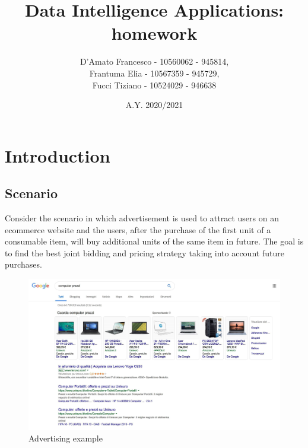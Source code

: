 \documentclass[12pt,a4paper]{report}
\title{Data Intelligence Applications: homework}
\author{D'Amato Francesco - 10560062 - 945814, \\
	Frantuma Elia - 10567359 - 945729, \\
	Fucci Tiziano - 10524029 - 946638}
\date{A.Y. 2020/2021}
\begin{document}
	\maketitle
	\tableofcontents
	\chapter{Introduction}
		\section{Scenario}
			Consider the scenario in which advertisement is used to attract users on an ecommerce website and the users, after the purchase of the first unit of a consumable item, will buy additional units of the same item in future. The goal is to find the best joint bidding and pricing strategy taking into account future purchases.

\begin{figure}[H]
\centering
  \includegraphics[scale = 0.3, center]{image0}
  \caption{Advertising example}
\end{figure}
\end{document}
